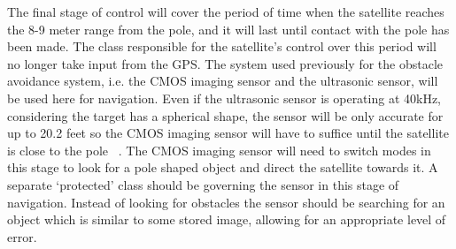 \documentclass[10pt,letterpaper,onecolumn,journal]{IEEEtran}
\begin{document}
\par
The final stage of control will cover the period of time when the satellite reaches the 8-9 meter range from the pole, and it will last until contact with the pole has been made. The class responsible for the satellite's control over this period will no longer take input from the GPS. The system used previously for the obstacle avoidance system, i.e. the CMOS imaging sensor and the ultrasonic sensor, will be used here for navigation. Even if the ultrasonic sensor is operating at 40kHz, considering the target has a spherical shape, the sensor will be only accurate for up to 20.2 feet so the CMOS imaging sensor will have to suffice until the satellite is close to the pole ~\cite{massa1999}. The CMOS imaging sensor will need to switch modes in this stage to look for a pole shaped object and direct the satellite towards it. A separate ‘protected’ class should be governing the sensor in this stage of navigation. Instead of looking for obstacles the sensor should be searching for an object which is similar to some stored image, allowing for an appropriate level of error. 
%
%
\end{document}
